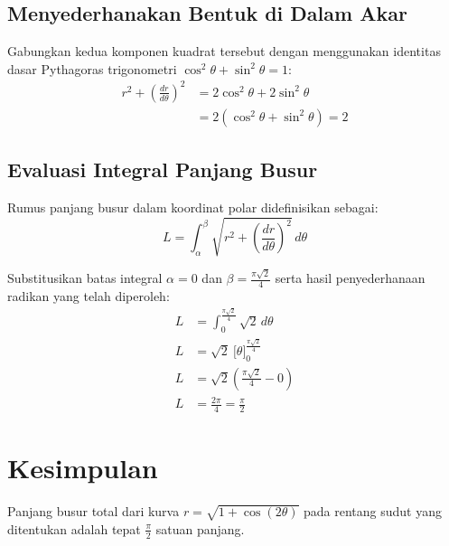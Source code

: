 \documentclass[11pt,a4paper]{article}
\begin{document}
\subsection{Menyederhanakan Bentuk di Dalam Akar}
Gabungkan kedua komponen kuadrat tersebut dengan menggunakan identitas dasar Pythagoras trigonometri $\cos^2\theta + \sin^2\theta = 1$:
\begin{align*}
  r^2 + \left(\frac{dr}{d\theta}\right)^2 &= 2\cos^2\theta + 2\sin^2\theta \\
  &= 2(\cos^2\theta + \sin^2\theta) = 2
\end{align*}

\subsection{Evaluasi Integral Panjang Busur}
Rumus panjang busur dalam koordinat polar didefinisikan sebagai:
\begin{equation}
  L = \int_{\alpha}^{\beta} \sqrt{r^2 + \left(\frac{dr}{d\theta}\right)^2} \, d\theta
\end{equation}

Substitusikan batas integral $\alpha = 0$ dan $\beta = \frac{\pi\sqrt{2}}{4}$ serta hasil penyederhanaan radikan yang telah diperoleh:
\begin{align*}
  L &= \int_{0}^{\frac{\pi\sqrt{2}}{4}} \sqrt{2} \, d\theta \\
  L &= \sqrt{2} \ \Big[ \theta \Big]_{0}^{\frac{\pi\sqrt{2}}{4}} \\
  L &= \sqrt{2} \left( \frac{\pi\sqrt{2}}{4} - 0 \right) \\
  L &= \frac{2\pi}{4} = \frac{\pi}{2}
\end{align*}

\section{Kesimpulan}
Panjang busur total dari kurva $r = \sqrt{1 + \cos(2\theta)}$ pada rentang sudut yang ditentukan adalah tepat \textbf{$\frac{\pi}{2}$} satuan panjang.
\end{document}
